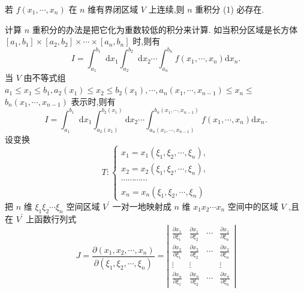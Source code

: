 若 \(f\left( {{x}_{1},\cdots ,{x}_{n}}\right)\) 在 \(n\) 维有界闭区域 \(V\) 上连续,则 \(n\) 重积分 (1) 必存在.

计算 \(n\) 重积分的办法是把它化为重数较低的积分来计算. 如当积分区域是长方体 \(\left\lbrack  {{a}_{1},{b}_{1}}\right\rbrack   \times  \left\lbrack  {{a}_{2},{b}_{2}}\right\rbrack   \times  \cdots  \times  \left\lbrack  {{a}_{n},{b}_{n}}\right\rbrack\) 时,则有
\[
I = {\int }_{{a}_{1}}^{{b}_{1}}\mathrm{\;d}{x}_{1}{\int }_{{a}_{2}}^{{b}_{2}}\mathrm{\;d}{x}_{2}\cdots {\int }_{{a}_{n}}^{{b}_{n}}f\left( {{x}_{1},\cdots ,{x}_{n}}\right) \mathrm{d}{x}_{n}.
\]
当 \(V\) 由不等式组 \({a}_{1} \leq  {x}_{1} \leq  {b}_{1},{a}_{2}\left( {x}_{1}\right)  \leq  {x}_{2} \leq  {b}_{2}\left( {x}_{1}\right) ,\cdots ,{a}_{n}\left( {{x}_{1},\cdots ,{x}_{n - 1}}\right)  \leq  {x}_{n} \leq\)  \({b}_{n}\left( {{x}_{1},\cdots ,{x}_{n - 1}}\right)\) 表示时,则有
\[
I = {\int }_{{a}_{1}}^{{b}_{1}}\mathrm{\;d}{x}_{1}{\int }_{{a}_{2}\left( {x}_{1}\right) }^{{b}_{2}\left( {x}_{1}\right) }\mathrm{d}{x}_{2}\cdots {\int }_{{a}_{n}\left( {{x}_{1},\cdots ,{x}_{n - 1}}\right) }^{{b}_{n}\left( {{x}_{1},\cdots ,{x}_{n - 1}}\right) }f\left( {{x}_{1},\cdots ,{x}_{n}}\right) \mathrm{d}{x}_{n}.
\]
设变换
\[
T : \left\{  \begin{array}{l} {x}_{1} = {x}_{1}\left( {{\xi }_{1},{\xi }_{2},\cdots ,{\xi }_{n}}\right) , \\  {x}_{2} = {x}_{2}\left( {{\xi }_{1},{\xi }_{2},\cdots ,{\xi }_{n}}\right) , \\  \cdots \cdots \cdots \cdots \\  {x}_{n} = {x}_{n}\left( {{\xi }_{1},{\xi }_{2},\cdots ,{\xi }_{n}}\right)  \end{array}\right.
\]
把 \(n\) 维 \({\xi }_{1}{\xi }_{2}\cdots {\xi }_{n}\) 空间区域 \({V}^{\prime }\) 一对一地映射成 \(n\) 维 \({x}_{1}{x}_{2}\cdots {x}_{n}\) 空间中的区域 \(V\) ,且在 \({V}^{\prime }\) 上函数行列式
\[
J = \frac{\partial \left( {{x}_{1},{x}_{2},\cdots ,{x}_{n}}\right) }{\partial \left( {{\xi }_{1},{\xi }_{2},\cdots ,{\xi }_{n}}\right) } = \left| \begin{matrix} \frac{\partial {x}_{1}}{\partial {\xi }_{1}} & \frac{\partial {x}_{1}}{\partial {\xi }_{2}} & \cdots & \frac{\partial {x}_{1}}{\partial {\xi }_{n}} \\  \frac{\partial {x}_{2}}{\partial {\xi }_{1}} & \frac{\partial {x}_{2}}{\partial {\xi }_{2}} & \cdots & \frac{\partial {x}_{2}}{\partial {\xi }_{n}} \\  \vdots & \vdots & & \vdots \\  \frac{\partial {x}_{n}}{\partial {\xi }_{1}} & \frac{\partial {x}_{n}}{\partial {\xi }_{2}} & \cdots & \frac{\partial {x}_{n}}{\partial {\xi }_{n}} \end{matrix}\right|
\]

